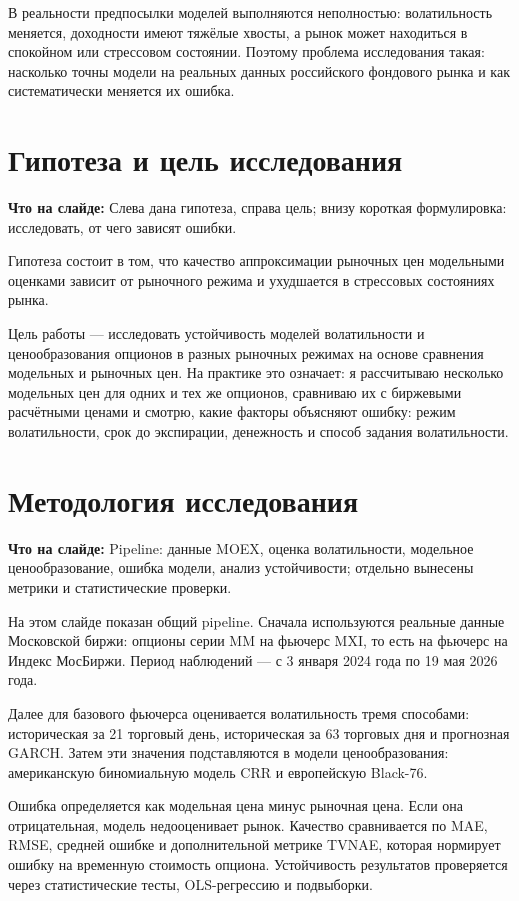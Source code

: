 \documentclass[11pt,a4paper]{article}
\newcommand{\whatsonslide}[1]{%
  \noindent\colorbox{softblue}{%
    \parbox{\dimexpr\linewidth-2\fboxsep\relax}{\textbf{Что на слайде:} #1}%
  }\par\vspace{0.2em}
}
\begin{document}
В реальности предпосылки моделей выполняются неполностью: волатильность меняется, доходности имеют тяжёлые хвосты, а рынок может находиться в спокойном или стрессовом состоянии. Поэтому проблема исследования такая: насколько точны модели на реальных данных российского фондового рынка и как систематически меняется их ошибка.

\section{Гипотеза и цель исследования}

\whatsonslide{Слева дана гипотеза, справа цель; внизу короткая формулировка: исследовать, от чего зависят ошибки.}

Гипотеза состоит в том, что качество аппроксимации рыночных цен модельными оценками зависит от рыночного режима и ухудшается в стрессовых состояниях рынка.

Цель работы --- исследовать устойчивость моделей волатильности и ценообразования опционов в разных рыночных режимах на основе сравнения модельных и рыночных цен. На практике это означает: я рассчитываю несколько модельных цен для одних и тех же опционов, сравниваю их с биржевыми расчётными ценами и смотрю, какие факторы объясняют ошибку: режим волатильности, срок до экспирации, денежность и способ задания волатильности.

\section{Методология исследования}

\whatsonslide{Pipeline: данные MOEX, оценка волатильности, модельное ценообразование, ошибка модели, анализ устойчивости; отдельно вынесены метрики и статистические проверки.}

На этом слайде показан общий pipeline. Сначала используются реальные данные Московской биржи: опционы серии MM на фьючерс MXI, то есть на фьючерс на Индекс МосБиржи. Период наблюдений --- с 3 января 2024 года по 19 мая 2026 года.

Далее для базового фьючерса оценивается волатильность тремя способами: историческая за 21 торговый день, историческая за 63 торговых дня и прогнозная GARCH. Затем эти значения подставляются в модели ценообразования: американскую биномиальную модель CRR и европейскую Black-76.

Ошибка определяется как модельная цена минус рыночная цена. Если она отрицательная, модель недооценивает рынок. Качество сравнивается по MAE, RMSE, средней ошибке и дополнительной метрике TVNAE, которая нормирует ошибку на временную стоимость опциона. Устойчивость результатов проверяется через статистические тесты, OLS-регрессию и подвыборки.
\end{document}
